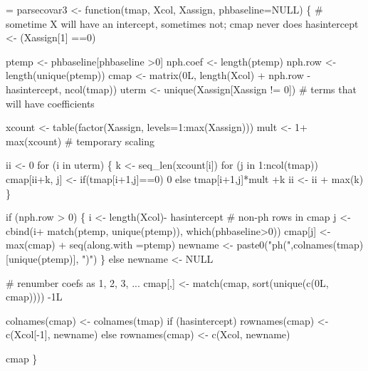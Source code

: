 \documentclass{article}
\begin{document}
\begin{nwchunk}
=
 parsecovar3 <- function(tmap, Xcol, Xassign, phbaseline=NULL) \{
     # sometime X will have an intercept, sometimes not; cmap never does
     hasintercept <- (Xassign[1] ==0)
 
     ptemp <- phbaseline[phbaseline >0]
     nph.coef <- length(ptemp)
     nph.row  <- length(unique(ptemp))
     cmap <- matrix(0L, length(Xcol) + nph.row - hasintercept, ncol(tmap))
     uterm <- unique(Xassign[Xassign != 0])   # terms that will have coefficients
     
     xcount <- table(factor(Xassign, levels=1:max(Xassign)))
     mult <- 1+ max(xcount)  # temporary scaling
 
     ii <- 0
     for (i in uterm) \{
         k <- seq_len(xcount[i])
         for (j in 1:ncol(tmap)) 
             cmap[ii+k, j] <- if(tmap[i+1,j]==0) 0 else tmap[i+1,j]*mult +k
         ii <- ii + max(k)
     \}
 
     if (nph.row > 0) \{
         i <- length(Xcol)- hasintercept      # non-ph rows in cmap
         j <- cbind(i+ match(ptemp, unique(ptemp)), which(phbaseline>0)) 
         cmap[j] <- max(cmap) + seq(along.with =ptemp)
         newname <- paste0("ph(",colnames(tmap)[unique(ptemp)], ")")
     \} else newname <- NULL
 
     # renumber coefs as 1, 2, 3, ...
     cmap[,] <- match(cmap, sort(unique(c(0L, cmap)))) -1L
     
     colnames(cmap) <- colnames(tmap)
     if (hasintercept) rownames(cmap) <- c(Xcol[-1], newname)
     else rownames(cmap) <- c(Xcol, newname)
 
     cmap
 \}
\end{nwchunk}
\end{document}
